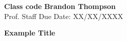 \noindent
\textbf{Class code} \hfill \textbf{Brandon Thompson} \\
\normalsize Prof. Staff \hfill Due Date: XX/XX/XXXX \\

\begin{center}
\textbf{Example Title}
\end{center}